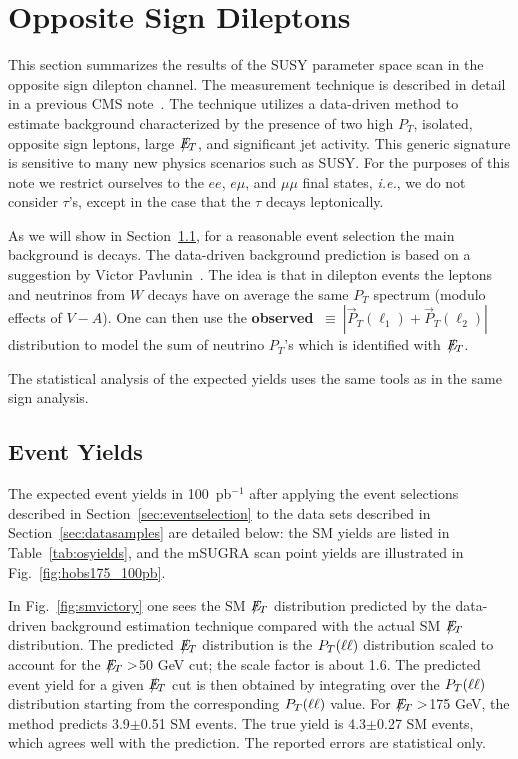 \section{Opposite Sign Dileptons}
\label{sec:osstudies}

This section summarizes the results of the SUSY parameter space scan
in the opposite sign dilepton channel. The measurement technique is
described in detail in a previous CMS note~\cite{osnote}. The technique
utilizes a data-driven method to estimate background characterized
by the presence of two high $P_T$, isolated, opposite sign leptons,
large $E\!\!\!\!/_T$, and significant jet activity. This generic signature is
sensitive to many new physics scenarios such as SUSY.  For the purposes
of this note we restrict ourselves to the $ee$, $e\mu$, and $\mu\mu$
final states, {\em i.e.}, we do not consider $\tau$'s, except in the
case that the $\tau$ decays leptonically. 

As we will show in Section~\ref{sec:osyields}, for a reasonable event
selection the main background is \ttbar decays. The data-driven
background prediction is based on a suggestion by Victor
Pavlunin~\cite{victor}. The idea is that in dilepton \ttbar events
the leptons and neutrinos from $W$ decays have on average the same
$P_T$ spectrum (modulo effects of $V-A$). One can then use the {\bf
observed} \ptll $~\equiv~|\vec{P}_T(\ell_1) + \vec{P}_T(\ell_2)|$
distribution to model the sum of neutrino $P_T$'s which is identified
with $E\!\!\!\!/_T$. 

The statistical analysis of the expected yields uses the same tools as in the same sign analysis.

\subsection{Event Yields}
\label{sec:osyields}

The expected event yields in 100~pb$^{-1}$ after applying the event selections
described in Section~\ref{sec:eventselection} to the data sets described in
Section~\ref{sec:datasamples} are detailed below: the SM yields are listed in
Table~\ref{tab:osyields}, and the mSUGRA scan point yields are illustrated in
Fig.~\ref{fig:hobs175_100pb}.

In Fig.~\ref{fig:smvictory} one sees the SM $E\!\!\!\!/_T$ distribution predicted
by the data-driven background estimation technique compared with the actual 
SM $E\!\!\!\!/_T$ distribution. The predicted $E\!\!\!\!/_T$ distribution
is the $P_T(\ell\ell)$ distribution scaled to account for the $E\!\!\!\!/_T>$50 GeV cut; the scale
factor is about 1.6. The predicted event yield for a given $E\!\!\!\!/_T$ cut is then obtained by integrating
over the $P_T(\ell\ell)$ distribution starting from the corresponding $P_T(\ell\ell)$ value. 
For $E\!\!\!\!/_T>$175 GeV, the method predicts
3.9$\pm$0.51 SM events. The true yield is 4.3$\pm$0.27 SM events, which agrees
well with the prediction. The reported errors are statistical only.

